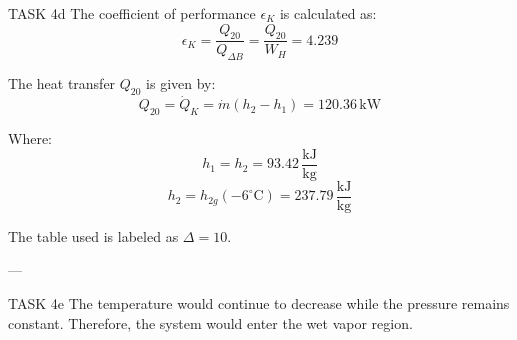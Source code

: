 TASK 4d  
The coefficient of performance \( \epsilon_K \) is calculated as:  
\[
\epsilon_K = \frac{Q_{20}}{Q_{\Delta B}} = \frac{Q_{20}}{W_H} = 4.239
\]

The heat transfer \( Q_{20} \) is given by:  
\[
Q_{20} = \dot{Q}_K = \dot{m}(h_2 - h_1) = 120.36 \, \text{kW}
\]

Where:  
\[
h_1 = h_2 = 93.42 \, \frac{\text{kJ}}{\text{kg}}
\]  
\[
h_2 = h_{2g}(-6^\circ\text{C}) = 237.79 \, \frac{\text{kJ}}{\text{kg}}
\]  

The table used is labeled as \( \Delta = 10 \).

---

TASK 4e  
The temperature would continue to decrease while the pressure remains constant. Therefore, the system would enter the wet vapor region.